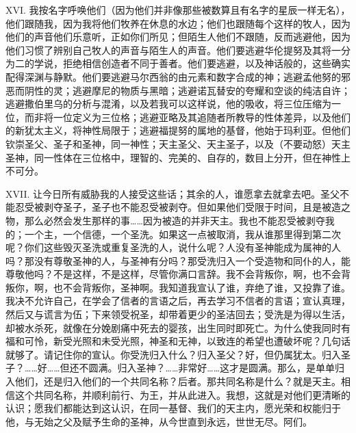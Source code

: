 XVI. 我按名字呼唤他们（因为他们并非像那些被数算且有名字的星辰一样无名），他们跟随我，因为我将他们牧养在休息的水边；他们也跟随每个这样的牧人，因为他们的声音他们乐意听，正如你们所见；但陌生人他们不跟随，反而逃避他，因为他们习惯了辨别自己牧人的声音与陌生人的声音。他们要逃避华伦提努及其将一分为二的学说，拒绝相信创造者不同于善者。他们要逃避，以及神话般的，这些确实配得深渊与静默。他们要逃避马尔西翁的由元素和数字合成的神；逃避孟他努的邪恶而阴性的灵；逃避摩尼的物质与黑暗；逃避诺瓦替安的夸耀和空谈的纯洁自许；逃避撒伯里乌的分析与混淆，以及若我可以这样说，他的吸收，将三位压缩为一位，而非将一位定义为三位格；逃避亚略及其追随者所教导的性体差异，以及他们的新犹太主义，将神性局限于；逃避福提努的属地的基督，他始于玛利亚。但他们钦崇圣父、圣子和圣神，同一神性；天主圣父、天主圣子，以及（不要动怒）天主圣神，同一性体在三位格中，理智的、完美的、自存的，数目上分开，但在神性上不可分。\par

XVII. 让今日所有威胁我的人接受这些话；其余的人，谁愿拿去就拿去吧。圣父不能忍受被剥夺圣子，圣子也不能忍受被剥夺。但如果他们受限于时间，且是被造之物，那么必然会发生那样的事……因为被造的并非天主。我也不能忍受被剥夺我的；一个主，一个信德，一个圣洗。如果这一点被取消，我从谁那里得到第二次呢？你们这些毁灭圣洗或重复圣洗的人，说什么呢？人没有圣神能成为属神的人吗？那没有尊敬圣神的人，与圣神有分吗？那受洗归入一个受造物和同仆的人，能尊敬他吗？不是这样，不是这样，尽管你满口言辞。我不会背叛你，啊，也不会背叛你，啊，也不会背叛你，圣神啊。我知道我宣认了谁，弃绝了谁，又投靠了谁。我决不允许自己，在学会了信者的言语之后，再去学习不信者的言语；宣认真理，然后又与谎言为伍；下来领受祝圣，却带着更少的圣洁回去；受洗是为得以生活，却被水杀死，就像在分娩剧痛中死去的婴孩，出生同时即死亡。为什么使我同时有福和可怜，新受光照和未受光照，神圣和无神，以致连的希望也遭破坏呢？几句话就够了。请记住你的宣认。你受洗归入什么？归入圣父？好，但仍属犹太。归入圣子？……好……但还不圆满。归入圣神？……非常好……这才是圆满。那么，是单单归入他们，还是归入他们的一个共同名称？后者。那共同名称是什么？就是天主。相信这个共同名称，并顺利前行、为王，并从此进入。我想，这就是对他们更清晰的认识；愿我们都能达到这认识，在同一基督、我们的天主内，愿光荣和权能归于他，与无始之父及赋予生命的圣神，从今世直到永远，世世无尽。阿们。\par

